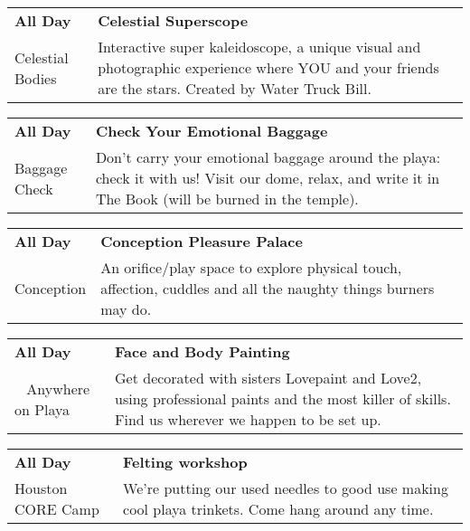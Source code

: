 \begin{tabular}{ p{1in} p{2.2in} }
    \textbf{All Day} & \textbf{Celestial Superscope} \\
    Celestial Bodies \newline  & Interactive super kaleidoscope, a unique visual and photographic experience where YOU and your friends are the stars. Created by Water Truck Bill. \\
    \hline 
\end{tabular}
    
\begin{tabular}{ p{1in} p{2.2in} }
    \textbf{All Day} & \textbf{Check Your Emotional Baggage} \\
    Baggage Check \newline  & Don't carry your emotional baggage around the playa: check it with us! Visit our dome, relax, and write it in The Book (will be burned in the temple). \\
    \hline 
\end{tabular}
    
\begin{tabular}{ p{1in} p{2.2in} }
    \textbf{All Day} & \textbf{Conception Pleasure Palace} \\
    Conception \newline  & An orifice/play space to explore physical touch, affection, cuddles and all the naughty things burners may do. \\
    \hline 
\end{tabular}
    
\begin{tabular}{ p{1in} p{2.2in} }
    \textbf{All Day} & \textbf{Face and Body Painting} \\
    ~ \newline Anywhere on Playa & Get decorated with sisters Lovepaint and Love2, using professional paints and the most killer of skills. Find us wherever we happen to be set up. \\
    \hline 
\end{tabular}
    
\begin{tabular}{ p{1in} p{2.2in} }
    \textbf{All Day} & \textbf{Felting workshop} \\
    Houston CORE Camp \newline  & We're putting our used needles to good use making cool playa trinkets. Come hang around any time. \\
    \hline 
\end{tabular}
    
